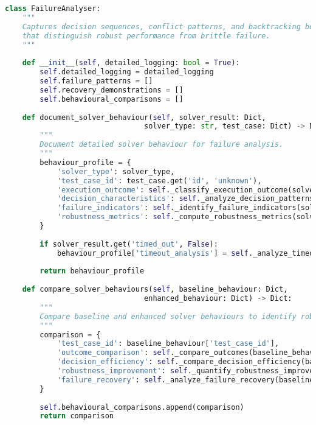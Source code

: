 \begin{lstlisting}[language=Python, caption=Systematic Failure Mode Documentation and Recovery Analysis]
class FailureAnalyser:
    """
    Captures decision sequences, conflict patterns, and backtracking behaviour 
    that distinguish robust performance from brittle failure.
    """
    
    def __init__(self, detailed_logging: bool = True):
        self.detailed_logging = detailed_logging
        self.failure_patterns = []
        self.recovery_demonstrations = []
        self.behavioural_comparisons = []
    
    def document_solver_behaviour(self, solver_result: Dict, 
                                solver_type: str, test_case: Dict) -> Dict:
        """
        Document detailed solver behaviour for failure analysis.
        """
        behaviour_profile = {
            'solver_type': solver_type,
            'test_case_id': test_case.get('id', 'unknown'),
            'execution_outcome': self._classify_execution_outcome(solver_result),
            'decision_characteristics': self._analyze_decision_patterns(solver_result),
            'failure_indicators': self._identify_failure_indicators(solver_result),
            'robustness_metrics': self._compute_robustness_metrics(solver_result)
        }
        
        if solver_result.get('timed_out', False):
            behaviour_profile['timeout_analysis'] = self._analyze_timeout_behaviour(solver_result)
        
        return behaviour_profile
    
    def compare_solver_behaviours(self, baseline_behaviour: Dict, 
                                enhanced_behaviour: Dict) -> Dict:
        """
        Compare baseline and enhanced solver behaviours to identify robustness improvements.
        """
        comparison = {
            'test_case_id': baseline_behaviour['test_case_id'],
            'outcome_comparison': self._compare_outcomes(baseline_behaviour, enhanced_behaviour),
            'decision_efficiency': self._compare_decision_efficiency(baseline_behaviour, enhanced_behaviour),
            'robustness_improvement': self._quantify_robustness_improvement(baseline_behaviour, enhanced_behaviour),
            'failure_recovery': self._analyze_failure_recovery(baseline_behaviour, enhanced_behaviour)
        }
        
        self.behavioural_comparisons.append(comparison)
        return comparison
    

\end{lstlisting}
